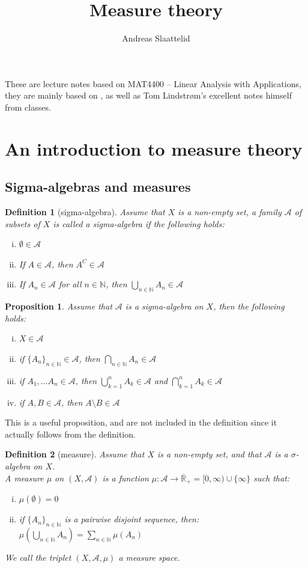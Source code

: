 \documentclass{article}
\title{Measure theory}
\author{Andreas Slaattelid}
\date{}
\newcommand{\R}{\mathbb{R}}
\newcommand{\N}{\mathbb{N}}
\newcommand{\A}{\mathcal{A}}
\newtheorem{definition}{Definition}
\newtheorem{prop}{Proposition}
\begin{document}
\maketitle  
\tableofcontents
These are lecture notes based on MAT4400 – Linear Analysis with Applications, they are mainly based on \cite{LindstrømSpaces}, as well as Tom Lindstrøm's excellent notes himself from classes. 

\newpage
\section{An introduction to measure theory}

\subsection{Sigma-algebras and measures}

\begin{definition}[sigma-algebra]
Assume that $X$ is a non-empty set, a family $\A$ of subsets of $X$ is called a sigma-algebra if the following holds: 
\begin{enumerate}[i)]
  \item $\emptyset \in \A$
  \item If $A\in \A$, then $A^{C}\in \A$ 
  \item If $A_{n} \in \A$ for all $n\in \N$, then $\bigcup_{n\in \N}A_{n}\in \A$
\end{enumerate}
\end{definition}

\begin{prop}
Assume that $\A$ is a sigma-algebra on $X$, then the following holds: 
\begin{enumerate}[i)]
    \item $X\in \A$
    \item if $\{A_{n}\}_{n\in \N} \in \A$, then $\bigcap_{n\in \N}A_{n} \in \A$
    \item if $A_{1}, \dots A_{n} \in \A$, then $\bigcup_{k=1}^{n}A_{k} \in \A$ and $\bigcap_{k=1}^{n}A_{k} \in \A$
    \item if $A,B \in \A$, then $A\setminus B \in \A$
\end{enumerate}
\end{prop}

This is a useful proposition, and are not included in the definition since it actually follows from the definition. 

\begin{definition}[measure]
Assume that $X$ is a non-empty set, and that $\A$ is a $\sigma$-algebra on $X$. \\ 
A measure $\mu$ on $(X,\A)$ is a function $\mu:\A\to \overline{\R}_{+} =[0,\infty)\cup \{\infty\}$ such that: 
\begin{enumerate}[i)]
    \item $\mu(\emptyset) = 0$ 
    \item if $\{A_{n}\}_{n\in \N}$ is a pairwise disjoint sequence, then: 
    $\mu\left(\bigcup_{n\in \N}A_{n}\right) = \sum_{n\in \N}\mu(A_{n})$ 
\end{enumerate}
We call the triplet $(X,\A,\mu)$ a measure space.
\end{definition}
\end{document}
